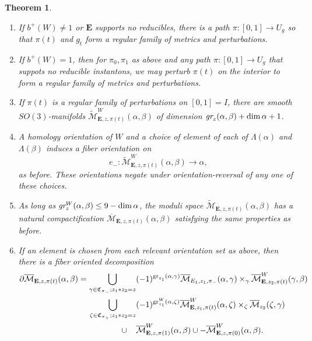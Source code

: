 \documentclass[10pt,a4paper]{amsart}
\newtheorem{theorem}{Theorem}
\theoremstyle{definition}
\theoremstyle{remark}
\numberwithin{figure}{qchap}
\begin{document}
\begin{theorem}
\begin{enumerate}
\item If $b^+(W) \neq 1$ or $\mathbf{E}$ supports no reducibles, there is a path $\pi: [0,1] \to U_g$ so that $\pi(t)$ and $g_t$ form a regular family of metrics and perturbations.
\item If $b^+(W) = 1$, then for $\pi_0, \pi_1$ as above and any path $\pi: [0,1] \to U_g$ that suppots no reducible instantons, we may perturb $\pi(t)$ on the interior to form a regular family of metrics and perturbations.\\
\item If $\pi(t)$ is a regular family of perturbations on $[0,1] = I$, there are smooth $SO(3)$-manifolds $\widetilde{\mathcal M}^W_{\mathbf{E},z,\pi(t)}(\alpha, \beta)$ of dimension $\text{\em{gr}}_z(\alpha, \beta) + \dim \alpha + 1$. \\
\item A homology orientation of $W$ and a choice of element of each of $\Lambda(\alpha)$ and $\Lambda(\beta)$ induces a fiber orientation on $$e_-: \widetilde{\mathcal M}^W_{\mathbf{E},z,\pi(t)}(\alpha, \beta) \to \alpha,$$ as before. These orientations negate under orientation-reversal of any one of these choices.\\
\item As long as $\text{\em{gr}}^W_z(\alpha, \beta) \leq 9 - \dim \alpha$, the moduli space $\widetilde{\mathcal M}_{\mathbf{E},z,\pi(t)}(\alpha, \beta)$ has a natural compactification $\overline{\mathcal M}_{\mathbf{E},z,\pi(t)}(\alpha, \beta)$ satisfying the same properties as before.\\
\item If an element is chosen from each relevant orientation set as above, then there is a fiber oriented decomposition \begin{align*}\partial \overline{\mathcal M}_{\mathbf E,z,\pi(t)}(\alpha, \beta) = \bigcup_{\gamma \in \mathfrak C_{\pi_-}; z_1 \ast z_2 = z} &(-1)^{\textup{gr}_{z_1}(\alpha, \gamma)}\overline{\mathcal M}_{E_1,z_1,\pi_-}(\alpha, \gamma) \times_\gamma \overline{\mathcal M}^W_{\mathbf{E},z_2,\pi(t)}(\gamma, \beta)\\
\bigcup_{\zeta \in \mathfrak C_{\pi_+}; z_1 \ast z_2 = z} &(-1)^{\textup{gr}^{W}_{z_1}(\alpha, \zeta)} \overline{\mathcal M}^W_{\mathbf{E}, z_1,\pi(t)}(\alpha, \zeta) \times_\zeta \overline{\mathcal M}_{z_2}(\zeta, \gamma)\\
\cup \; \; \; \; &\overline{\mathcal M}^W_{\mathbf{E},z,\pi(1)}(\alpha, \beta) \cup -\overline{\mathcal M}^W_{\mathbf{E},z,\pi(0)}(\alpha, \beta).\\
\end{align*}


\end{enumerate}
\end{theorem}
\end{document}
